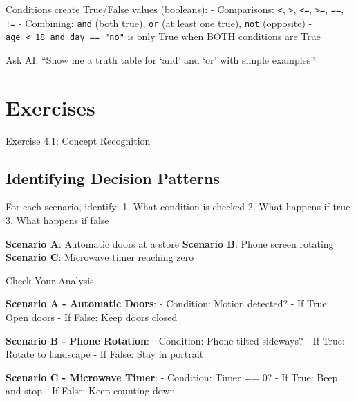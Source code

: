\documentclass[
  letterpaper,
  DIV=11,
  numbers=noendperiod,
  oneside]{scrreprt}
\begin{document}
\begin{tcolorbox}[enhanced jigsaw, opacityback=0, colback=white, colframe=quarto-callout-note-color-frame, breakable, titlerule=0mm, coltitle=black, rightrule=.15mm, colbacktitle=quarto-callout-note-color!10!white, left=2mm, bottomtitle=1mm, bottomrule=.15mm, title=\textcolor{quarto-callout-note-color}{\faInfo}\hspace{0.5em}{Expression Explorer: Boolean Logic}, opacitybacktitle=0.6, toptitle=1mm, leftrule=.75mm, arc=.35mm, toprule=.15mm]

Conditions create True/False values (booleans): - Comparisons:
\texttt{\textless{}}, \texttt{\textgreater{}}, \texttt{\textless{}=},
\texttt{\textgreater{}=}, \texttt{==}, \texttt{!=} - Combining:
\texttt{and} (both true), \texttt{or} (at least one true), \texttt{not}
(opposite) - \texttt{age\ \textless{}\ 18\ and\ day\ ==\ "no"} is only
True when BOTH conditions are True

Ask AI: ``Show me a truth table for `and' and `or' with simple
examples''

\end{tcolorbox}

\section{Exercises}\label{exercises-4}

Exercise 4.1: Concept Recognition

\subsection{Identifying Decision
Patterns}\label{identifying-decision-patterns}

For each scenario, identify: 1. What condition is checked 2. What
happens if true 3. What happens if false

\textbf{Scenario A}: Automatic doors at a store \textbf{Scenario B}:
Phone screen rotating \textbf{Scenario C}: Microwave timer reaching zero

Check Your Analysis

\textbf{Scenario A - Automatic Doors}: - Condition: Motion detected? -
If True: Open doors - If False: Keep doors closed

\textbf{Scenario B - Phone Rotation}: - Condition: Phone tilted
sideways? - If True: Rotate to landscape - If False: Stay in portrait

\textbf{Scenario C - Microwave Timer}: - Condition: Timer == 0? - If
True: Beep and stop - If False: Keep counting down
\end{document}
